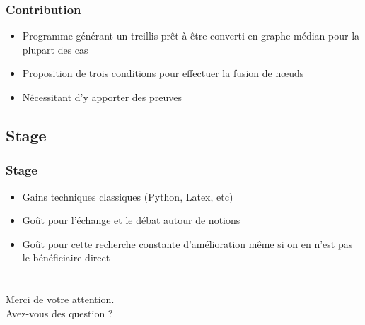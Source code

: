 \documentclass{beamer}
\begin{document}
\begin{frame}
	\frametitle{Contribution}
	\begin{itemize}
		\item Programme générant un treillis prêt à être converti en graphe médian pour la plupart des cas
		\item Proposition de trois conditions pour effectuer la fusion de n\oe uds
		\item Nécessitant d'y apporter des preuves
	\end{itemize}
\end{frame}

\subsection{Stage}

\begin{frame}
	\frametitle{Stage}
	\begin{itemize}
		\item Gains techniques classiques (Python, Latex, etc)
		\item Goût pour l'échange et le débat autour de notions
		\item Goût pour cette recherche constante d'amélioration même si on en n'est pas le bénéficiaire direct
	\end{itemize}
\end{frame}

\section*{}

%

\subsection*{}

\begin{frame}
	\begin{center}
		
		
	\end{center}
\end{frame}

\begin{frame}
	\begin{center}
		Merci de votre attention.\\
		Avez-vous des question ?
	\end{center}
\end{frame}
\end{document}
